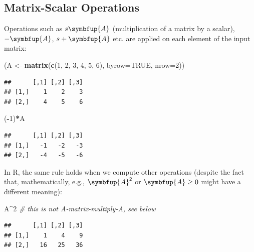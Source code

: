 \documentclass[10pt,b5paper,krantz1]{krantz}
\newenvironment{Shaded}{\begin{snugshade}}{\end{snugshade}}
\newcommand{\CommentTok}[1]{\textcolor[rgb]{0.37,0.37,0.37}{\textit{#1}}}
\newcommand{\DataTypeTok}[1]{\textcolor[rgb]{0.27,0.27,0.27}{#1}}
\newcommand{\DecValTok}[1]{\textcolor[rgb]{0.06,0.06,0.06}{#1}}
\newcommand{\KeywordTok}[1]{\textcolor[rgb]{0.27,0.27,0.27}{\textbf{#1}}}
\newcommand{\NormalTok}[1]{#1}
\newcommand{\OperatorTok}[1]{\textcolor[rgb]{0.43,0.43,0.43}{\textbf{#1}}}
\newcommand{\OtherTok}[1]{\textcolor[rgb]{0.37,0.37,0.37}{#1}}
\newcommand{\StringTok}[1]{\textcolor[rgb]{0.5,0.5,0.5}{#1}}
\renewcommand{\mathbf}[1]{\symbfup{#1}}
\begin{document}
\hypertarget{matrix-scalar-operations}{%
\subsection{Matrix-Scalar Operations}\label{matrix-scalar-operations}}

Operations such as \(s\mathbf{A}\) (multiplication of a matrix
by a scalar), \(-\mathbf{A}\), \(s+\mathbf{A}\) etc.
are applied on each element of the input matrix:

\begin{Shaded}
\begin{Highlighting}[]
\NormalTok{(A <-}\StringTok{ }\KeywordTok{matrix}\NormalTok{(}\KeywordTok{c}\NormalTok{(}\DecValTok{1}\NormalTok{, }\DecValTok{2}\NormalTok{, }\DecValTok{3}\NormalTok{, }\DecValTok{4}\NormalTok{, }\DecValTok{5}\NormalTok{, }\DecValTok{6}\NormalTok{), }\DataTypeTok{byrow=}\OtherTok{TRUE}\NormalTok{, }\DataTypeTok{nrow=}\DecValTok{2}\NormalTok{))}
\end{Highlighting}
\end{Shaded}

\begin{verbatim}
##      [,1] [,2] [,3]
## [1,]    1    2    3
## [2,]    4    5    6
\end{verbatim}

\begin{Shaded}
\begin{Highlighting}[]
\NormalTok{(}\OperatorTok{-}\DecValTok{1}\NormalTok{)}\OperatorTok{*}\NormalTok{A}
\end{Highlighting}
\end{Shaded}

\begin{verbatim}
##      [,1] [,2] [,3]
## [1,]   -1   -2   -3
## [2,]   -4   -5   -6
\end{verbatim}

In R, the same rule holds when we compute other
operations (despite the fact that, mathematically,
e.g., \(\mathbf{A}^2\) or \(\mathbf{A}\ge 0\) might have a different meaning):

\begin{Shaded}
\begin{Highlighting}[]
\NormalTok{A}\OperatorTok{^}\DecValTok{2} \CommentTok{# this is not A-matrix-multiply-A, see below}
\end{Highlighting}
\end{Shaded}

\begin{verbatim}
##      [,1] [,2] [,3]
## [1,]    1    4    9
## [2,]   16   25   36
\end{verbatim}
\end{document}
